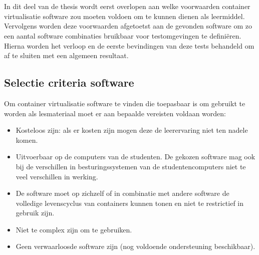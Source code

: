 
\chapter{}
\label{ch:methodologie}
In dit deel van de thesis wordt eerst overlopen aan welke voorwaarden container virtualisatie software zou moeten voldoen om te kunnen dienen als leermiddel. Vervolgens worden deze voorwaarden afgetoetst aan de gevonden software om zo een aantal software combinaties bruikbaar voor testomgevingen te definiëren. Hierna worden het verloop en de eerste bevindingen van deze tests behandeld om af te sluiten met een algemeen resultaat.


\section{Selectie criteria software}
Om container virtualisatie software te vinden die toepasbaar is om gebruikt te worden als lesmateriaal moet er aan bepaalde vereisten voldaan worden:

\begin{itemize}
    \item Kosteloos zijn: als er kosten zijn mogen deze de leerervaring niet ten nadele komen.
    \item Uitvoerbaar op de computers van de studenten. De gekozen software mag ook bij de verschillen in besturingssystemen van de studentencomputers niet te veel verschillen in werking.
    \item De software moet op zichzelf of in combinatie met andere software de volledige levenscyclus van containers kunnen tonen en niet te restrictief in gebruik zijn.
    \item Niet te complex zijn om te gebruiken.
    \item Geen verwaarloosde software zijn (nog voldoende ondersteuning beschikbaar).
\end{itemize}
    
